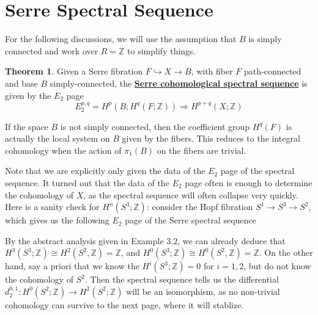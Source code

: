 \documentclass{article}
\theoremstyle{definition}
\newtheorem{theorem}{Theorem}[section]
\theoremstyle{definition}
\theoremstyle{definition}
\theoremstyle{definition}
\theoremstyle{definition}
\theoremstyle{definition}
\theoremstyle{definition}
\begin{document}
\section{Serre Spectral Sequence}
For the following discussions, we will use the assumption that $B$ is simply connected and work over $R=\mathbb{Z}$ to simplify things. 


\begin{tcolorbox}[colback=red!5!white,colframe=red!30!white]
\begin{theorem}
	Given a Serre fibration $F\hookrightarrow X\to B$, with fiber $F$ path-connected and base $B$ simply-connected, the \underline{\textbf{Serre cohomological spectral sequence}} is given by the $E_2$ page 
	\[
	E_2^{p,q}=H ^{p}(B; H ^{q}(F; \mathbb{Z})) \Longrightarrow H ^{p+q}(X; \mathbb{Z})
	\]
\end{theorem}
\end{tcolorbox}

If the space $B$ is not simply connected, then the coefficient group $H ^{q}(F)$ is actually the local system on $B$ given by the fibers. This reduces to the integral cohomology when the action of $\pi_1(B)$ on the fibers are trivial.

Note that we are explicitly only given the data of the $E_2$ page of the spectral sequence. It turned out that the data of the $E_2$ page often is enough to determine the cohomology of $X$, as the spectral sequence will often collapse very quickly. Here is a sanity check for $H^n(S^3; \mathbb{Z})$: consider the Hopf fibration $S^1\to S^3\to S^2$, which gives us the following $E_2$ page of the Serre spectral sequence


By the abstract analysis given in Example $3.2$, we can already deduce that $H^3(S^3;\mathbb{Z})\cong H^2(S^2, \mathbb{Z})=\mathbb{Z}$, and  $H^0(S^3;\mathbb{Z})\cong H^0(S^2, \mathbb{Z})=\mathbb{Z}$. On the other hand, say a priori that we know the $H^i(S^3;\mathbb{Z})=0$ for $i=1,2$, but do not know the cohomology of $S^2$. Then the spectral sequence tells us the differential $d_2^{0,1}: H^0(S^2;\mathbb{Z})\to H^2(S^2;\mathbb{Z})$ will be an isomorphism, as no non-trivial cohomology can survive to the next page, where it will stablize.
\end{document}
